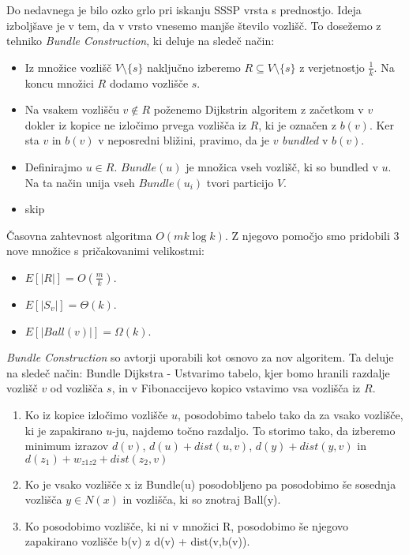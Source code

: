 \documentclass{article}
\begin{document}
Do nedavnega je bilo ozko grlo pri iskanju SSSP vrsta s prednostjo. Ideja izboljšave je v tem, da v vrsto vnesemo manjše število vozlišč. To dosežemo z tehniko \textit{Bundle Construction}, ki deluje na sledeč način:
\begin{itemize}
  \item Iz množice vozlišč $V \setminus \{s\}$ naključno izberemo $R \subseteq V \setminus \{s\}$ z verjetnostjo $\frac{1}{k}$. Na koncu množici $R$ dodamo vozlišče $s$.
  \item Na vsakem vozlišču $v \notin R$ poženemo Dijkstrin algoritem z začetkom v $v$ dokler iz kopice ne izločimo prvega vozlišča iz $R$, ki je označen z $b(v)$. Ker sta $v$ in $b(v)$ v neposredni bližini, pravimo, da je $v$ \textit{bundled} v $b(v)$.
  \item Definirajmo $u \in R$. $Bundle(u)$ je množica vseh vozlišč, ki so bundled v $u$. Na ta način unija vseh $Bundle(u_i)$ tvori particijo $V$.
  \item skip
\end{itemize}

Časovna zahtevnost algoritma $O(m k \log k)$. Z njegovo pomočjo smo pridobili 3 nove množice s pričakovanimi velikostmi:
\begin{itemize}
  \item $E[|R|] = O(\frac{m}{k})$.
  \item $E[|S_v|] = \Theta(k)$.
  \item $E[|Ball(v)|] = \Omega(k)$.
\end{itemize}

\textit{Bundle Construction} so avtorji uporabili kot osnovo za nov algoritem. Ta deluje na sledeč način:
Bundle Dijkstra - Ustvarimo tabelo, kjer bomo hranili razdalje vozlišč $v$ od vozlišča $s$, in v Fibonaccijevo kopico vstavimo vsa vozlišča iz $R$.
\begin{enumerate}
  \item
  Ko iz kopice izločimo vozlišče $u$, posodobimo tabelo tako da za vsako vozlišče, ki je zapakirano $u$-ju, najdemo točno razdaljo. To storimo tako, da izberemo minimum izrazov $d(v)$, $d(u) + dist(u,v)$, $d(y) + dist(y,v)$ in $d(z_1) + w_{z1z2} + dist(z_2,v)$
  \item
  Ko je vsako vozlišče x iz Bundle(u) posodobljeno pa posodobimo še sosednja vozlišča $y \in N(x)$ in vozlišča, ki so znotraj Ball(y).
  \item
  Ko posodobimo vozlišče, ki ni v množici R, posodobimo še njegovo zapakirano vozlišče b(v) z d(v) + dist(v,b(v)).


\end{enumerate}
\end{document}
